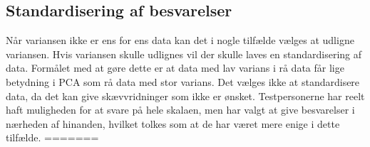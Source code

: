 \subsection{Standardisering af besvarelser}
Når variansen ikke er ens for ens data kan det i nogle tilfælde vælges at udligne variansen. Hvis variansen skulle udlignes vil der skulle laves en standardisering af data. Formålet med at gøre dette er at data med lav varians i rå data får lige betydning i PCA som rå data med stor varians. \blankline
%
Det vælges ikke at standardisere data, da det kan give skævvridninger som ikke er ønsket. Testpersonerne har reelt haft muligheden for at svare på hele skalaen, men har valgt at give besvarelser i nærheden af hinanden, hvilket tolkes som at de har været mere enige i dette tilfælde. \blankline
=======
%
%
%
%
%
%
